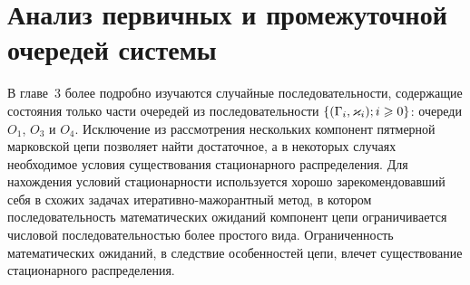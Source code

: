 \chapter{Анализ первичных и промежуточной очередей системы}	

В главе~3 более подробно изучаются случайные последовательности,  содержащие состояния только части очередей из последовательности $\Mark$: очереди $O_1$,  $O_3$ и $O_4$. Исключение из рассмотрения нескольких компонент пятмерной марковской цепи позволяет найти достаточное,  а в некоторых случаях  необходимое условия существования стационарного распределения. Для нахождения условий стационарности используется хорошо зарекомендовавший себя в схожих задачах итеративно-мажорантный метод,  в котором последовательность математических ожиданий компонент цепи ограничивается числовой последовательностью более простого вида.
Ограниченность математических ожиданий,  в следствие особенностей цепи,  влечет существование стационарного распределения.

